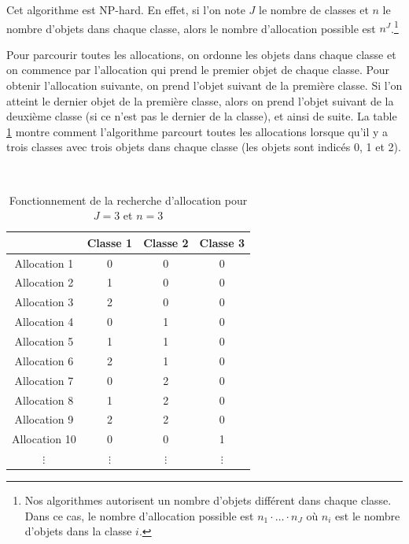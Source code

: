 \documentclass{article}
\begin{document}
Cet algorithme est NP-hard.
En effet, si l'on note $J$ le nombre de classes et $n$ le nombre d'objets dans chaque classe, alors le nombre d'allocation possible est $n^J$.\footnote{Nos algorithmes autorisent un nombre d'objets différent dans chaque classe. Dans ce cas, le nombre d'allocation possible est $n_1 \cdot \dots \cdot n_J$ où $n_i$ est le nombre d'objets dans la classe $i$.}

Pour parcourir toutes les allocations, on ordonne les objets dans chaque classe et on commence par l'allocation qui prend le premier objet de chaque classe.
Pour obtenir l'allocation suivante, on prend l'objet suivant de la première classe.
Si l'on atteint le dernier objet de la première classe, alors on prend l'objet suivant de la deuxième classe (si ce n'est pas le dernier de la classe), et ainsi de suite.
La table \ref{tab:recherche-exhaustive} montre comment l'algorithme parcourt toutes les allocations lorsque qu'il y a trois classes avec trois objets dans chaque classe (les objets sont indicés 0, 1 et 2).

\begin{table}[!ht]
	\centering
	\caption{Fonctionnement de la recherche d'allocation pour $J=3$ et $n=3$}
	\label{tab:recherche-exhaustive}
	~\\
	\begin{tabular}{c|ccc}
		& Classe 1 & Classe 2 & Classe 3\\
		\hline
		Allocation 1 & 0 & 0 & 0\\
		Allocation 2 & 1 & 0 & 0\\
		Allocation 3 & 2 & 0 & 0\\
		Allocation 4 & 0 & 1 & 0\\
		Allocation 5 & 1 & 1 & 0\\
		Allocation 6 & 2 & 1 & 0\\
		Allocation 7 & 0 & 2 & 0\\
		Allocation 8 & 1 & 2 & 0\\
		Allocation 9 & 2 & 2 & 0\\
		Allocation 10 & 0 & 0 & 1\\
		$\vdots$ & $\vdots$ & $\vdots$ & $\vdots$\\
	\end{tabular}
\end{table}
\end{document}
